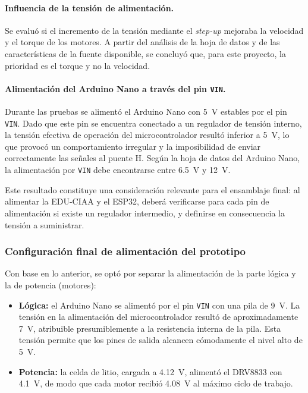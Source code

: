 \documentclass[12pt,a4paper]{article}
\begin{document}
\paragraph{Influencia de la tensión de alimentación.}
Se evaluó si el incremento de la tensión mediante el \emph{step-up} mejoraba la velocidad y el torque de los motores. A partir del análisis de la hoja de datos y de las características de la fuente disponible, se concluyó que, para este proyecto, la prioridad es el torque y no la velocidad.

\paragraph{Alimentación del Arduino Nano a través del pin \texttt{VIN}.}
Durante las pruebas se alimentó el Arduino Nano con \SI{5}{V} estables por el pin \texttt{VIN}. Dado que este pin se encuentra conectado a un regulador de tensión interno, la tensión efectiva de operación del microcontrolador resultó inferior a \SI{5}{V}, lo que provocó un comportamiento irregular y la imposibilidad de enviar correctamente las señales al puente H. Según la hoja de datos del Arduino Nano, la alimentación por \texttt{VIN} debe encontrarse entre \SI{6,5}{V} y \SI{12}{V}.

Este resultado constituye una consideración relevante para el ensamblaje final: al alimentar la EDU-CIAA y el ESP32, deberá verificarse para cada pin de alimentación si existe un regulador intermedio, y definirse en consecuencia la tensión a suministrar.

\subsubsection{Configuración final de alimentación del prototipo}
Con base en lo anterior, se optó por separar la alimentación de la parte lógica y la de potencia (motores):

\begin{itemize}[nosep]
  \item \textbf{Lógica:} el Arduino Nano se alimentó por el pin \texttt{VIN} con una pila de \SI{9}{V}. La tensión en la alimentación del microcontrolador resultó de aproximadamente \SI{7}{V}, atribuible presumiblemente a la resistencia interna de la pila. Esta tensión permite que los pines de salida alcancen cómodamente el nivel alto de \SI{5}{V}.
  \item \textbf{Potencia:} la celda de litio, cargada a \SI{4,12}{V}, alimentó el DRV8833 con \SI{4,1}{V}, de modo que cada motor recibió \SI{4,08}{V} al máximo ciclo de trabajo.
\end{itemize}
\end{document}

